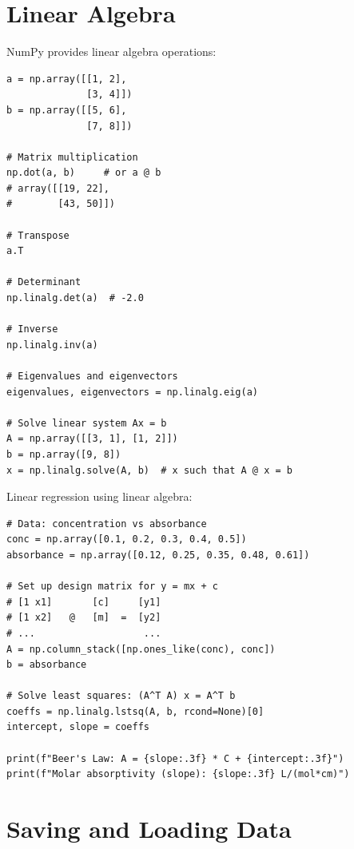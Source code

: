 \section{Linear Algebra}
\label{sec:linear-algebra}

NumPy provides linear algebra operations:

\begin{lstlisting}
a = np.array([[1, 2],
              [3, 4]])
b = np.array([[5, 6],
              [7, 8]])

# Matrix multiplication
np.dot(a, b)     # or a @ b
# array([[19, 22],
#        [43, 50]])

# Transpose
a.T

# Determinant
np.linalg.det(a)  # -2.0

# Inverse
np.linalg.inv(a)

# Eigenvalues and eigenvectors
eigenvalues, eigenvectors = np.linalg.eig(a)

# Solve linear system Ax = b
A = np.array([[3, 1], [1, 2]])
b = np.array([9, 8])
x = np.linalg.solve(A, b)  # x such that A @ x = b
\end{lstlisting}

\begin{labexample}
Linear regression using linear algebra:

\begin{lstlisting}
# Data: concentration vs absorbance
conc = np.array([0.1, 0.2, 0.3, 0.4, 0.5])
absorbance = np.array([0.12, 0.25, 0.35, 0.48, 0.61])

# Set up design matrix for y = mx + c
# [1 x1]       [c]     [y1]
# [1 x2]   @   [m]  =  [y2]
# ...                   ...
A = np.column_stack([np.ones_like(conc), conc])
b = absorbance

# Solve least squares: (A^T A) x = A^T b
coeffs = np.linalg.lstsq(A, b, rcond=None)[0]
intercept, slope = coeffs

print(f"Beer's Law: A = {slope:.3f} * C + {intercept:.3f}")
print(f"Molar absorptivity (slope): {slope:.3f} L/(mol*cm)")
\end{lstlisting}
\end{labexample}

\section{Saving and Loading Data}
\label{sec:numpy-io}

